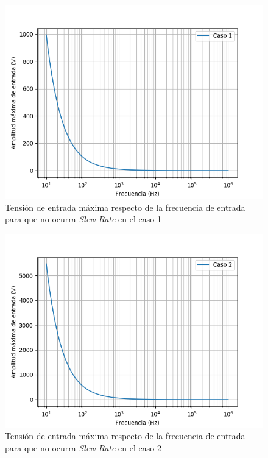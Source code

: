 \begin{figure}[H]
\begin{centering}
\includegraphics[scale=0.5]{../Ex1/iB/Resources1b/slewRate1}
\par\end{centering}
\caption{Tensión de entrada máxima respecto de la frecuencia de entrada para
que no ocurra \emph{Slew Rate} en el caso 1}
\label{1_b_23}
\end{figure}

\begin{figure}[H]
\begin{centering}
\includegraphics[scale=0.5]{../Ex1/iB/Resources1b/slewRate2}
\par\end{centering}
\caption{Tensión de entrada máxima respecto de la frecuencia de entrada para
que no ocurra \emph{Slew Rate} en el caso 2}
\label{1_b_24}
\end{figure}

